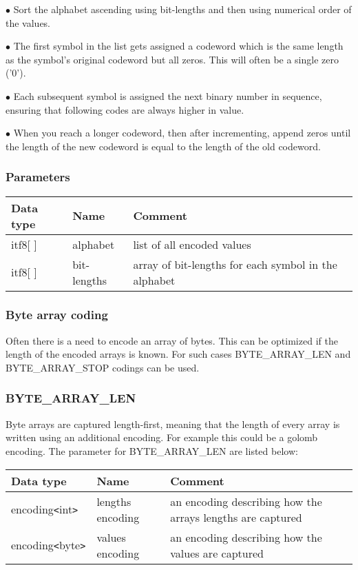 \documentclass[a4paper]{article}
\begin{document}
$\bullet$ Sort the alphabet ascending using bit-lengths and then using numerical order 
of the values.

$\bullet$ The first symbol in the list gets assigned a codeword which is the same length 
as the symbol's original codeword but all zeros. This will often be a single zero 
('0').

$\bullet$ Each subsequent symbol is assigned the next binary number in sequence, ensuring 
that following codes are always higher in value.

$\bullet$ When you reach a longer codeword, then after incrementing, append zeros until 
the length of the new codeword is equal to the length of the old codeword.

\subsubsection*{Parameters}

\begin{tabular}{|>{\raggedright}p{100pt}|>{\raggedright}p{100pt}|>{\raggedright}p{230pt}|}
\hline
\textbf{Data type} & \textbf{Name} & \textbf{Comment}
\tabularnewline
\hline
itf8[ ] & alphabet & list of all encoded values\tabularnewline
\hline
itf8[ ] & bit-lengths & array of bit-lengths for each symbol in the alphabet\tabularnewline
\hline
\end{tabular}

\subsubsection*{Byte array coding}

Often there is a need to encode an array of bytes. This can be optimized if the 
length of the encoded arrays is known. For such cases BYTE\_ARRAY\_LEN and BYTE\_ARRAY\_STOP 
codings can be used. 

\subsubsection*{BYTE\_ARRAY\_LEN }

Byte arrays are captured length-first, meaning that the length of every array is 
written using an additional encoding. For example this could be a golomb encoding. 
The parameter for BYTE\_ARRAY\_LEN are listed below:

\begin{tabular}{|>{\raggedright}p{100pt}|>{\raggedright}p{100pt}|>{\raggedright}p{230pt}|}
\hline
\textbf{Data type} & \textbf{Name} & \textbf{Comment}
\tabularnewline
\hline
encoding\texttt{<}int\texttt{>} & lengths encoding & an encoding describing how 
the arrays lengths are captured\tabularnewline
\hline
encoding\texttt{<}byte\texttt{>} & values encoding & an encoding describing how 
the values are captured\tabularnewline
\hline
\end{tabular}
\end{document}
